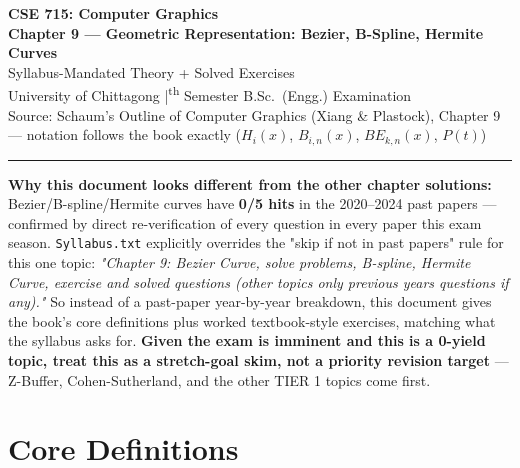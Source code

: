 \documentclass[12pt, a4paper]{article}
\newenvironment{notesbox}{\begin{mdframed}[style=notesframe]}{\end{mdframed}}
\begin{document}
\begin{center}
  {\LARGE\bfseries\color{sectionblue} CSE 715: Computer Graphics}\\[0.6em]
  {\Large\bfseries Chapter 9 --- Geometric Representation: Bezier, B-Spline, Hermite Curves}\\[0.3em]
  {\large Syllabus-Mandated Theory + Solved Exercises}\\[0.2em]
  {\normalsize University of Chittagong \quad|\textsuperscript{th} Semester B.Sc.\ (Engg.) Examination}\\[0.3em]
  {\small Source: Schaum's Outline of Computer Graphics (Xiang \& Plastock), Chapter 9 --- notation follows the book exactly ($H_i(x)$, $B_{i,n}(x)$, $BE_{k,n}(x)$, $P(t)$)}
\end{center}

\vspace{0.3em}\noindent\rule{\linewidth}{1pt}\vspace{0.5em}

\begin{notesbox}
\textbf{Why this document looks different from the other chapter solutions:} Bezier/B-spline/Hermite curves have \textbf{0/5 hits} in the 2020--2024 past papers --- confirmed by direct re-verification of every question in every paper this exam season. \texttt{Syllabus.txt} explicitly overrides the "skip if not in past papers" rule for this one topic: \textit{"Chapter 9: Bezier Curve, solve problems, B-spline, Hermite Curve, exercise and solved questions (other topics only previous years questions if any)."} So instead of a past-paper year-by-year breakdown, this document gives the book's core definitions plus worked textbook-style exercises, matching what the syllabus asks for. \textbf{Given the exam is imminent and this is a 0-yield topic, treat this as a stretch-goal skim, not a priority revision target} --- Z-Buffer, Cohen-Sutherland, and the other TIER 1 topics come first.
\end{notesbox}

\tableofcontents
\newpage

\section{Core Definitions}

\end{document}

